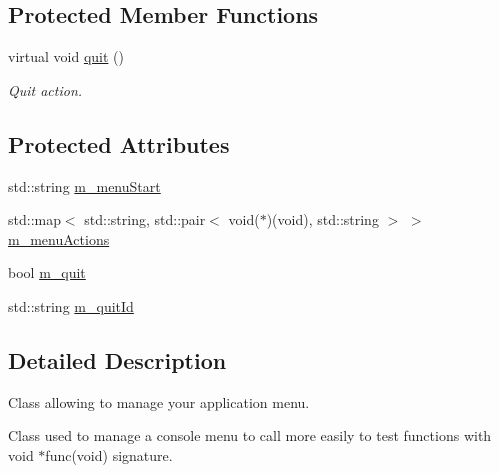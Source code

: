 \subsection*{\-Protected \-Member \-Functions}
\begin{DoxyCompactItemize}
\item 
virtual void \hyperlink{classdwf__utils_1_1menu_manager_adb12e6d8f7844089b4e1fd130f06df0b}{quit} ()
\begin{DoxyCompactList}\small\item\em \-Quit action. \end{DoxyCompactList}\end{DoxyCompactItemize}
\subsection*{\-Protected \-Attributes}
\begin{DoxyCompactItemize}
\item 
std\-::string \hyperlink{classdwf__utils_1_1menu_manager_ad5bf586a25449c2fb4ebba6dd36b9d43}{m\-\_\-menu\-Start}
\item 
std\-::map$<$ std\-::string, \*
std\-::pair$<$ void($\ast$)(void), \*
std\-::string $>$ $>$ \hyperlink{classdwf__utils_1_1menu_manager_ae8707504317fb8fb0e970a3fe59e2b07}{m\-\_\-menu\-Actions}
\item 
bool \hyperlink{classdwf__utils_1_1menu_manager_a1ca50905e47677b7fa6fd523cc161961}{m\-\_\-quit}
\item 
std\-::string \hyperlink{classdwf__utils_1_1menu_manager_a5ca4d1705a71907d7148891314739f50}{m\-\_\-quit\-Id}
\end{DoxyCompactItemize}


\subsection{\-Detailed \-Description}
\-Class allowing to manage your application menu. 

\-Class used to manage a console menu to call more easily to test functions with void $\ast$func(void) signature. 

